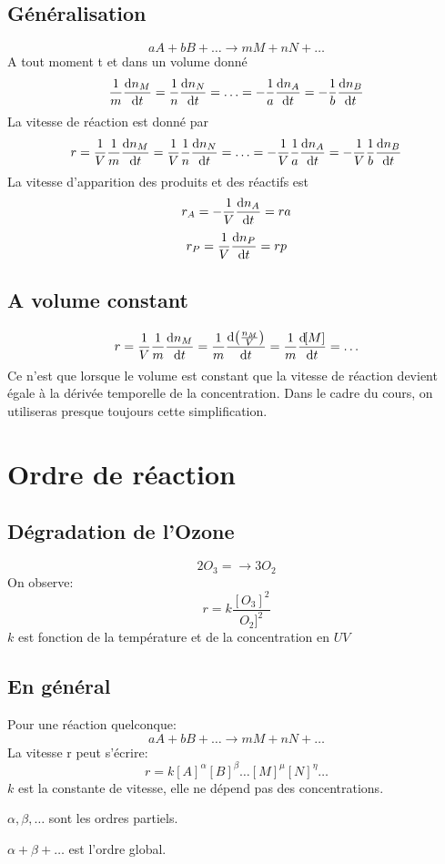 \subsection{Généralisation}
\[ aA+bB+\ldots \longrightarrow mM + nN + \ldots \]
A tout moment t et dans un volume donné
\[ \frac 1m \frac {\dif n_M}{\dif t} = \frac 1n \frac{\dif n_N}{\dif t}
  = \ldots = -\frac 1a \frac{\dif n_A}{\dif t}
  = -\frac 1b \frac{\dif n_B}{\dif t} \]
La vitesse de réaction est donné par
  \[ r = \frac 1V \frac 1m \frac {\dif n_M}{\dif t} =
  \frac 1V \frac 1n \frac {\dif n_N}{\dif t} = \ldots =
  -\frac 1V \frac 1a \frac {\dif n_A}{\dif t}
  = -\frac 1V \frac 1b \frac {\dif n_B}{\dif t} \]
La vitesse d'apparition des produits et des réactifs est
\[ r_A = -\frac 1V \frac {\operatorname{d}\! n_A}{\operatorname{d}\! t} = ra \]
\[ r_P = \frac 1V \frac {\operatorname{d}\! n_P}{\operatorname{d}\! t} = rp \]

\subsection{A volume constant}
\[ r = \frac 1V \frac 1m \frac {\operatorname{d}\! n_M}{\operatorname{d}\! t} =
  \frac 1m \frac {\operatorname{d}\! \left(\frac {n_M}V\right)}{\operatorname{d}\! t} =
  \frac 1m \frac {\operatorname{d}\! [M]}{\operatorname{d}\! t} = \ldots \]
Ce n'est que lorsque le volume est constant que la vitesse de
réaction devient égale à la dérivée temporelle de la concentration.
Dans le cadre du cours, on utiliseras presque toujours cette simplification.
\section{Ordre de réaction}
\subsection{Dégradation de l'Ozone}
\[ 2O_3 = \longrightarrow 3O_2 \]
On observe:
\[  r = k \frac{[O_3]^2}{O_2]^2} \]
$k$ est fonction de la température et de la concentration en $UV$

\subsection{En général}
Pour une réaction quelconque:
\[ aA+bB+\ldots \longrightarrow mM + nN + \ldots \]
La vitesse r peut s'écrire:
\[  r = k[A]^{\alpha}[B]^{\beta}\ldots[M]^{\mu}[N]^{\eta}\ldots \]
$k$ est la constante de vitesse, elle ne dépend pas des concentrations.

$\alpha,\beta,\ldots$ sont les ordres partiels.

$\alpha+\beta+\ldots$ est l'ordre global.

